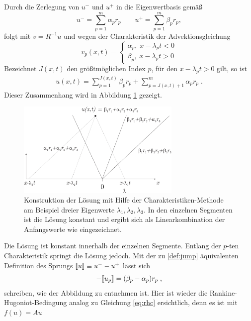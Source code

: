Durch die Zerlegung von $u^-$ und $u^+$ in die Eigenwertbasis gemäß
\begin{equation*}
  u^- = \sum_{p=1}^m \alpha_p r_p \qquad u^+ = \sum_{p=1}^m \beta_p r_p,
\end{equation*}
folgt mit $v = R^{-1}u$ und wegen der Charakteristik der Advektionsgleichung
\begin{equation*}
  v_p(x,t) = \begin{cases} \alpha_p , \; x - \lambda_p t < 0 \\
                           \beta_p  , \; x - \lambda_p t > 0
             \end{cases}
\end{equation*}
Bezeichnet $J(x,t)$ den größtmöglichen Index $p$, für den $x-\lambda_p t > 0$ gilt, so ist
\begin{align}
  u(x,t) = \sum_{p=1}^{J(x,t)} \beta_p r_p + \sum_{p={J(x,t)}+1}^m \alpha_p r_p \; .
\end{align}
Dieser Zusammenhang wird in Abbildung \ref{fig:torte} gezeigt.
\begin{figure}
  \centering
  \includegraphics[width=0.7\textwidth]{files/Torte.pdf}
  \caption{Konstruktion der Lösung mit Hilfe der Charakteristiken-Methode am Beispiel dreier Eigenwerte $\lambda_1,\lambda_2,\lambda_3$. In den einzelnen Segmenten ist die Lösung konstant und ergibt sich als Linearkombination der Anfangswerte wie eingezeichnet.}
  \label{fig:torte}
\end{figure}
Die Lösung ist konstant innerhalb der einzelnen Segmente. Entlang der $p$-ten Charakteristik springt die Lösung jedoch. Mit der zu \ref{def:jump} äquivalenten Definition des Sprungs ${\llbracket u \rrbracket\equiv u^- - u^+}$ lässt sich
\begin{equation}
  -\llbracket u_p \rrbracket = (\beta_p - \alpha_p) r_p \; ,
  \label{eq:TortenJump}
\end{equation}
schreiben, wie der Abbildung zu entnehmen ist. Hier ist wieder die Rankine-Hugoniot-Bedingung analog zu Gleichung \eqref{eq:rhc} ersichtlich, denn es ist mit $f(u) = A u$
